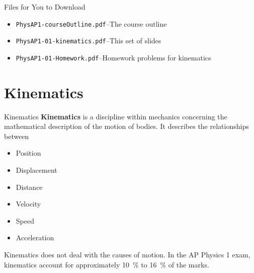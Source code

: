\documentclass[12pt,compress,aspectratio=169]{beamer}
\begin{document}
\begin{frame}
  \titlepage
\end{frame}



\begin{frame}{Files for You to Download}
  \begin{itemize}
  \item\texttt{PhysAP1-courseOutline.pdf}--The course outline
  \item\texttt{PhysAP1-01-kinematics.pdf}--This set of slides
  \item\texttt{PhysAP1-01-Homework.pdf}--Homework problems for kinematics
  \end{itemize}
%  
\end{frame}






\section{Kinematics}

\begin{frame}{Kinematics}
  \textbf{Kinematics} is a discipline within mechanics concerning the
  mathematical description of the motion of bodies. It describes the
  relationships between 
  \begin{itemize}
  \item<alert@1> Position
  \item<alert@1> Displacement
  \item Distance 
  \item<alert@1> Velocity
  \item Speed
  \item<alert@1> Acceleration
  \end{itemize}
  Kinematics does not deal with the causes of motion. In the AP Physics 1 exam,
  kinematics account for approximately \SI{10}{\percent} to \SI{16}{\percent} of
  the marks.
\end{frame}
\end{document}
